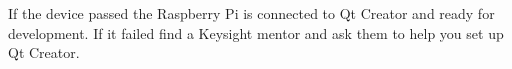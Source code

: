 \documentclass{article}
\begin{document}
If the device passed the Raspberry Pi is connected to Qt Creator and ready for development. If it failed find a Keysight mentor and ask them to help you set up Qt Creator.




	
	







\end{document}
